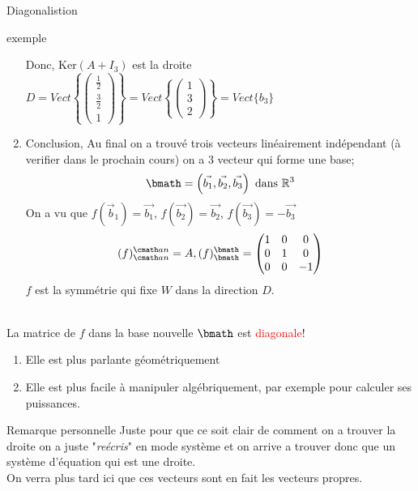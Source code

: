 \begin{parag}{Diagonalistion}
\begin{subparag}{exemple}
\begin{enumerate}
Donc, Ker$(A + I_3)$ est la droite $D = Vect\left\{ \begin{pmatrix}
    \frac{1}{2}\\ \frac{3}{2} \\ 1
\end{pmatrix}\right\} =  Vect \left\{\begin{pmatrix}
    1 \\ 3 \\ 2
\end{pmatrix}\right\} = Vect \{b_3\}$
    \item Conclusion, Au final on a trouvé trois vecteurs linéairement indépendant (à verifier dans le prochain cours) on a $3$ vecteur qui forme une base;
    \[\bmath = \left(\vec{b_1}, \vec{b_2}, \vec{b_3} \right) \text{ dans } \mathbb{R}^3\]
    On a vu que $f(\vec{b}_1) = \vec{b_1}$, $f(\vec{b_2})= \vec{b_2}$, $f(\vec{b_3}) = -\vec{b_3}$\\
    \[(f)_{\cmath an}^{\cmath an} = A, (f)_\bmath^\bmath = \begin{pmatrix}
        1 & 0 & 0 \\
        0 & 1 & 0 \\
        0 & 0 & -1
    \end{pmatrix}\]
    $f$ est la symmétrie qui fixe $W$ dans la direction $D$.
    \end{enumerate}
    \\
    La matrice de $f$ dans la base nouvelle $\bmath$ est \textcolor{red}{diagonale}!
    \begin{enumerate}
        \item Elle est plus parlante géométriquement
        \item Elle est plus facile à manipuler algébriquement, par exemple  pour calculer ses puissances.
    \end{enumerate}
    \end{subparag}
    \begin{subparag}{Remarque personnelle}
        Juste pour que ce soit clair de comment on a trouver la droite on a juste "\textit{reécris}" en mode système et on arrive a trouver donc que un système d'équation qui est une droite.\\
        On verra plus tard ici que ces vecteurs sont en fait les vecteurs propres.
    \end{subparag}
\end{parag}


